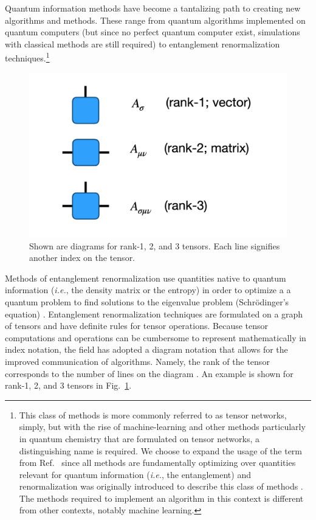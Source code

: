 \documentclass{juliacon}
\begin{document}
Quantum information methods have become a tantalizing path to creating new algorithms and methods. These range from quantum algorithms implemented on quantum computers \cite{nielsen2010quantum} (but since no perfect quantum computer exist, simulations with classical methods are still required) to entanglement renormalization techniques.\footnote{This class of methods is more commonly referred to as tensor networks, simply, but with the rise of machine-learning and other methods particularly in quantum chemistry that are formulated on tensor networks, a distinguishing name is required. We choose to expand the usage of the term from Ref.~\cite{vidal2007entanglement} since all methods are fundamentally optimizing over quantities relevant for quantum information ({\it i.e.}, the entanglement) and renormalization was originally introduced to describe this class of methods \cite{wilson1983renormalization,krishna1980renormalization}. The methods required to implement an algorithm in this context is different from other contexts, notably machine learning.} 

\begin{figure}
\includegraphics[width=\columnwidth]{diagram.png}
\caption{Shown are diagrams for rank-1, 2, and 3 tensors. Each line signifies another index on the tensor.
\label{diagram}
}
\end{figure}

Methods of entanglement renormalization use quantities native to quantum information ({\it i.e.}, the density matrix or the entropy) in order to optimize a a quantum problem to find solutions to the eigenvalue problem (Schr\"odinger's equation) \cite{townsend2000modern}. Entanglement renormalization techniques are formulated on a graph of tensors and have definite rules for tensor operations. Because tensor computations and operations can be cumbersome to represent mathematically in index notation, the field has adopted a diagram notation that allows for the improved communication of algorithms. Namely, the rank of the tensor corresponds to the number of lines on the diagram \cite{penrose1971angular}. An example is shown for rank-1, 2, and 3 tensors in Fig.~\ref{diagram}. 
\end{document}
